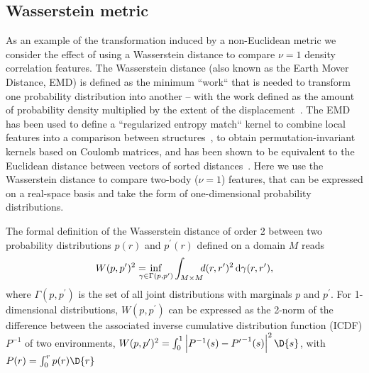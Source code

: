 \subsection{Wasserstein metric}
As an example of the transformation induced by a non-Euclidean metric we consider the effect of using a Wasserstein distance to compare $\nu=1$ density correlation features. 
The Wasserstein distance (also known as the Earth Mover Distance, EMD) is defined as the minimum  ``work`` that is needed to transform one probability distribution into another -- with the work defined as the amount of probability density multiplied by the extent of the displacement~\cite{vall74siam,cohe-guib97report,cutu07proc}.
The EMD has been used to define a ``regularized entropy match`` kernel to combine local features into a comparison between structures~\cite{de+16pccp}, to obtain permutation-invariant kernels based on Coulomb matrices\cite{cayl+20mlst}, and  has been shown to be equivalent to the Euclidean distance between vectors of sorted distances~\cite{will+19jcp}.
Here we use the Wasserstein distance to compare two-body ($\nu=1$) features, that can be expressed on a real-space basis and take the form of one-dimensional probability distributions. 

The formal definition of the Wasserstein distance of order 2 between two probability distributions $p(r)$ and $p^{\prime}(r)$ defined on a domain $M$ reads
\begin{equation}
W(p,p^{\prime})^2 = \hspace{-1em}\inf_{\gamma\in\Gamma (p,p^{\prime})} \int_{M\times M}\hspace{-0.5em}d(r,r^{\prime})^2\,\mathrm{d}\gamma(r,r^{\prime}),
%
\end{equation}
where $\Gamma(p,p^{\prime})$ is the set of all joint distributions with marginals $p$ and $p^{\prime}$.
For 1-dimensional distributions, $W(p,p^{\prime})$ can be expressed as the 2-norm of the difference between the associated inverse cumulative distribution function (ICDF) $P^{-1}$ of two environments,
$W(p,p^{\prime})^2=\int_0^1  \left|P^{-1}(s) -{P^{\prime}}^{-1}(s)\right|^2\D{s}$, with $P(r)=\int_0^r p(r)\D{r}$ 

